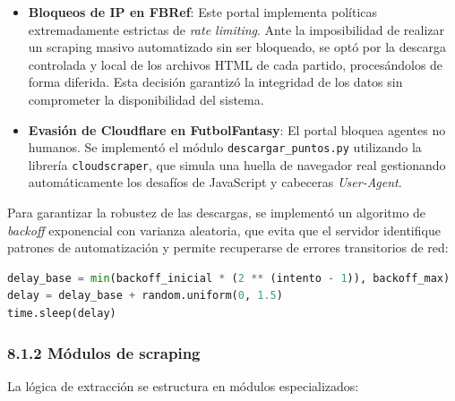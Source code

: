\begin{itemize}
    \item \textbf{Bloqueos de IP en FBRef}: Este portal implementa políticas extremadamente
    estrictas de \textit{rate limiting}. Ante la imposibilidad de realizar un scraping masivo
    automatizado sin ser bloqueado, se optó por la descarga controlada y local de los archivos
    HTML de cada partido, procesándolos de forma diferida. Esta decisión garantizó la
    integridad de los datos sin comprometer la disponibilidad del sistema.
 
    \item \textbf{Evasión de Cloudflare en FutbolFantasy}: El portal bloquea agentes no
    humanos. Se implementó el módulo \texttt{descargar\_puntos.py} utilizando la librería
    \texttt{cloudscraper}, que simula una huella de navegador real gestionando
    automáticamente los desafíos de JavaScript y cabeceras \textit{User-Agent}.
\end{itemize}
 
Para garantizar la robustez de las descargas, se implementó un algoritmo de
\textit{backoff} exponencial con varianza aleatoria, que evita que el servidor identifique
patrones de automatización y permite recuperarse de errores transitorios de red:
 
\begin{lstlisting}[language=Python,caption={Algoritmo de reintentos con backoff exponencial}]
delay_base = min(backoff_inicial * (2 ** (intento - 1)), backoff_max)
delay = delay_base + random.uniform(0, 1.5)
time.sleep(delay)
\end{lstlisting}
 
\subsubsection{8.1.2 Módulos de scraping}
 
La lógica de extracción se estructura en módulos especializados:
 

